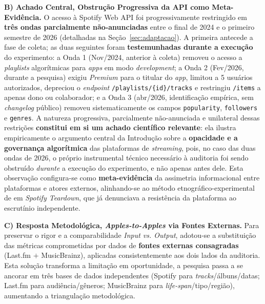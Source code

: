 \documentclass[12pt, %
openright,
oneside, %
a4paper,    %
english,   %
brazil]{facom-ufu-abntex2}
\begin{document}
\textbf{B) Achado Central, Obstrução Progressiva da API como Meta-Evidência.}
O acesso à Spotify Web API foi progressivamente restringido em \textbf{três
ondas parcialmente não-anunciadas} entre o final de 2024 e o primeiro semestre
de 2026 (detalhadas na Seção~\ref{sec:adaptacao}). A primeira antecede a fase de
coleta; as duas seguintes foram \textbf{testemunhadas durante a execução} do
experimento: a Onda 1 (Nov/2024, anterior à coleta)
removeu o acesso a \emph{playlists} algorítmicas para \emph{apps} em modo
\emph{development}; a Onda 2 (Fev/2026, durante a pesquisa) exigiu \emph{Premium}
para o titular do
\emph{app}, limitou a 5 usuários autorizados, depreciou o \emph{endpoint}
\texttt{/playlists/\{id\}/tracks} e restringiu \texttt{/items} a apenas dono ou
colaborador; e a Onda 3 (abr/2026, identificação empírica, sem \emph{changelog}
público) removeu
sistematicamente os campos \texttt{popularity}, \texttt{followers} e
\texttt{genres}. A natureza progressiva, parcialmente não-anunciada e unilateral
dessas restrições \textbf{constitui em si um achado científico relevante}: ela
ilustra empiricamente o argumento central da Introdução sobre a \textbf{opacidade
e a governança algorítmica} das plataformas de \emph{streaming}, pois, no caso
das duas ondas de 2026, o próprio
instrumental técnico necessário à auditoria foi sendo obstruído \emph{durante} a
execução do experimento, e não apenas antes dele. Esta observação configura-se como \textbf{meta-evidência}
da assimetria informacional entre plataformas e atores externos, alinhando-se ao
método etnográfico-experimental de  em
\emph{Spotify Teardown}, que já denunciava a resistência da plataforma ao
escrutínio independente.

\textbf{C) Resposta Metodológica, \emph{Apples-to-Apples} via Fontes Externas.}
Para preservar o rigor e a comparabilidade \emph{Input vs. Output}, adotou-se a
substituição das métricas comprometidas por dados de \textbf{fontes externas
consagradas} (Last.fm $+$ MusicBrainz), aplicadas consistentemente aos dois lados
da auditoria. Esta solução transforma a limitação em oportunidade, a pesquisa
passa a se ancorar em três bases de dados independentes (Spotify para
\emph{tracks}/álbuns/datas; Last.fm para audiência/gêneros; MusicBrainz para
\emph{life-span}/tipo/região), aumentando a triangulação metodológica.
\end{document}
